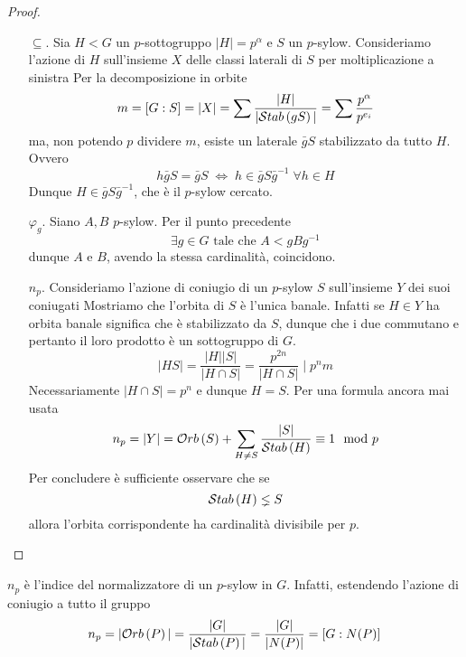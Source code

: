 \begin{multicols}{2}
\begin{proof}
\begin{itemize}
		\item[$ \subseteq $.] Sia $ H < G $ un $ p $-sottogruppo $ |H| = p^\alpha $ e $ S $ un $ p $-sylow. Consideriamo l'azione di $ H $ sull'insieme $ X $ delle classi laterali di $ S $ per moltiplicazione a sinistra
		Per la decomposizione in orbite
		\[ m=[G:S]=|X| = \sum\frac{|H|}{|\mathcal{S}tab\left( gS \right)|} = \sum\frac{p^\alpha}{p^{e_i}} \]
		ma, non potendo $ p $ dividere $ m $, esiste un laterale $ \bar{g}S $ stabilizzato da tutto $ H $. Ovvero
		\[ h\bar{g}S = \bar{g}S \;\Leftrightarrow\; h \in \bar{g}S\bar{g}^{-1} \; \forall h \in H \]
		Dunque $ H \in \bar{g}S\bar{g}^{-1} $, che è il $ p $-sylow cercato.
		
		\item[$ \varphi_g $.] Siano $ A, B $ $ p $-sylow. Per il punto precedente  \[ \exists g \in G \text{ tale che } A < gBg^{-1} \]
		dunque $ A $ e $ B $, avendo la stessa cardinalità, coincidono.
		\item[$ n_p $.] Consideriamo l'azione di coniugio di un $ p $-sylow $ S $ sull'insieme $ Y $ dei suoi coniugati
		Mostriamo che l'orbita di $ S $ è l'unica banale. Infatti se $ H \in Y $ ha orbita banale significa che è stabilizzato da $ S $, dunque che i due commutano e pertanto il loro prodotto è un sottogruppo di $ G $. \[ |HS| = \frac{|H||S|}{|H \cap S|} = \frac{p^{2n}}{|H \cap S|} \mid p^nm \] Necessariamente $ |H \cap S| = p^n $ e dunque $ H = S $. Per una formula ancora mai usata
		\[ n_p = |Y| = \mathcal{O}rb\left( S \right) + \sum_{H \neq S}\frac{|S|}{\mathcal{S}tab\left( H \right)} \equiv 1 \mod{p} \]
		Per concludere è sufficiente osservare che se $$  \mathcal{S}tab\left( H \right) \lneq S  $$ allora l'orbita corrispondente ha cardinalità divisibile per $ p $.
	\end{itemize}
\end{proof}

\begin{remark}
	$ n_p $ è l'indice del normalizzatore di un $ p$-sylow in $ G $. Infatti, estendendo l'azione di coniugio a tutto il gruppo
	\[ n_p = |\mathcal{O}rb\left( P \right)| = \frac{|G|}{|\mathcal{S}tab\left( P \right)|} = \frac{|G|}{|N(P)|} = [G : N(P)] \]
\end{remark}


\end{multicols}
